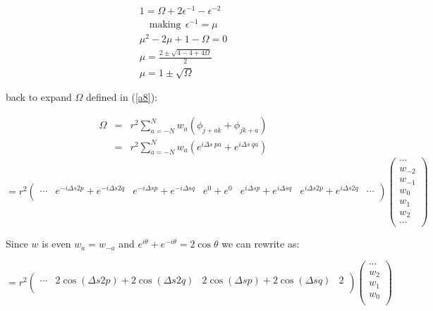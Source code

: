 \documentclass[legalpaper, 12pt]{article}
\begin{document}
\begin{eqnarray}
1  =  \Omega + 2 \epsilon^{-1} -\epsilon^{-2} \nonumber \\
\quad \text{making} \ \ \epsilon^{-1} = \mu \nonumber \\
\mu^2 - 2 \mu + 1 -\Omega = 0 \nonumber \\
\mu = \frac{ 2 \pm \sqrt{ 4 - 4 +4 \Omega}}{2} \nonumber \\
\mu = 1 \pm \sqrt{ \Omega} \label{a9}
\end{eqnarray}

back to expand $ \Omega $ defined in (\ref{a8}):

\begin{eqnarray}
\Omega &=& r^2 \sum_{a=-N}^N  w_a \left( \phi_{j+a k} + \phi_{j k+a}  \right) \nonumber \\
	&=& r^2 \sum_{a=-N}^{N} w_a ( e^{i \Delta s \ p a} + e^{i \Delta s \ q a} )\nonumber 
\end{eqnarray}
\begin{equation}
=r^2
\begin{pmatrix}
 \cdots & e^{-i \Delta s 2 p} + e^{-i \Delta s 2 q} & e^{-i \Delta s p} + e^{-i \Delta s q} & e^0+e^0 & e^{i \Delta s p} + e^{i \Delta s q} & e^{i \Delta s 2 p} + e^{i \Delta s 2 q} & \cdots \\
\end{pmatrix}
\begin{pmatrix}
\cdots \\
w_{-2} \\
w_{-1} \\
w_0 \\
w_1 \\
w_2 \\
\cdots
\end{pmatrix}
\nonumber
\end{equation}

Since $w$ is even $ w_a = w_{-a} $ and $ e^{i\theta} + e^{-i\theta} = 2 \cos{\theta} $ we can rewrite as:

\begin{equation}
=r^2
\begin{pmatrix}
 \cdots & 2\cos( \Delta s 2 p) + 2\cos(\Delta s 2 q) & 2\cos(\Delta s p) + 2\cos(\Delta s q) & 2 \\
\end{pmatrix}
\begin{pmatrix}
\cdots \\
w_{2} \\
w_{1} \\
w_0 \\
\end{pmatrix}
\nonumber
\end{equation}
\end{document}
